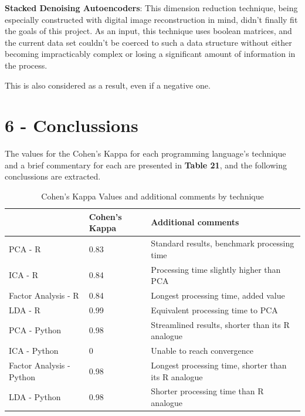 \documentclass[]{article}
\begin{document}
\textbf{Stacked Denoising Autoencoders}: This dimension reduction
technique, being especially constructed with digital image
reconstruction in mind, didn't finally fit the goals of this project. As
an input, this technique uses boolean matrices, and the current data set
couldn't be coerced to such a data structure without either becoming
impracticably complex or losing a significant amount of information in
the process.

This is also considered as a result, even if a negative one.

\section{6 - Conclussions}\label{conclussions}

The values for the Cohen's Kappa for each programming language's
technique and a brief commentary for each are presented in \textbf{Table
21}, and the following conclussions are extracted.

\begin{table}

\caption{\label{tab:result_table}Cohen's Kappa Values and additional comments by technique}
\centering
\begin{tabular}[t]{l|l|l}
\hline
  & Cohen's Kappa & Additional comments\\
\hline
PCA - R & 0.83 & Standard results, benchmark processing time\\
\hline
ICA - R & 0.84 & Processing time slightly higher than PCA\\
\hline
Factor Analysis - R & 0.84 & Longest processing time, added value\\
\hline
LDA - R & 0.99 & Equivalent processing time to PCA\\
\hline
PCA - Python & 0.98 & Streamlined results, shorter than its R analogue\\
\hline
ICA - Python & 0 & Unable to reach convergence\\
\hline
Factor Analysis - Python & 0.98 & Longest processing time, shorter than its R analogue\\
\hline
LDA - Python & 0.98 & Shorter processing time than R analogue\\
\hline
\end{tabular}
\end{table}
\end{document}
